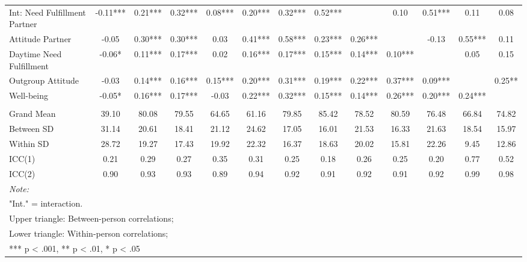 \begin{sidewaystable*}[!hbtp]
{\begin{tabular}[t]{lcccccccccccc}
\hspace{1em}Int: Need Fulfillment Partner & -0.11*** & 0.21*** & 0.32*** & 0.08*** & 0.20*** & 0.32*** & 0.52*** &  & 0.10 & 0.51*** & 0.11 & 0.08\\
\hspace{1em}Attitude Partner & -0.05 & 0.30*** & 0.30*** & 0.03 & 0.41*** & 0.58*** & 0.23*** & 0.26*** &  & -0.13 & 0.55*** & 0.11\\
\hspace{1em}Daytime Need Fulfillment & -0.06* & 0.11*** & 0.17*** & 0.02 & 0.16*** & 0.17*** & 0.15*** & 0.14*** & 0.10*** &  & 0.05 & 0.15\\
\hspace{1em}Outgroup Attitude & -0.03 & 0.14*** & 0.16*** & 0.15*** & 0.20*** & 0.31*** & 0.19*** & 0.22*** & 0.37*** & 0.09*** &  & 0.25**\\
\hspace{1em}Well-being & -0.05* & 0.16*** & 0.17*** & -0.03 & 0.22*** & 0.32*** & 0.15*** & 0.14*** & 0.26*** & 0.20*** & 0.24*** & \\
\addlinespace[0.3em]
\multicolumn{13}{l}{\textbf{Descriptives}}\\
\hspace{1em}Grand Mean & 39.10 & 80.08 & 79.55 & 64.65 & 61.16 & 79.85 & 85.42 & 78.52 & 80.59 & 76.48 & 66.84 & 74.82\\
\hspace{1em}Between SD & 31.14 & 20.61 & 18.41 & 21.12 & 24.62 & 17.05 & 16.01 & 21.53 & 16.33 & 21.63 & 18.54 & 15.97\\
\hspace{1em}Within SD & 28.72 & 19.27 & 17.43 & 19.92 & 22.32 & 16.37 & 18.63 & 20.02 & 15.81 & 22.26 & 9.45 & 12.86\\
\hspace{1em}ICC(1) & 0.21 & 0.29 & 0.27 & 0.35 & 0.31 & 0.25 & 0.18 & 0.26 & 0.25 & 0.20 & 0.77 & 0.52\\
\hspace{1em}ICC(2) & 0.90 & 0.93 & 0.93 & 0.89 & 0.94 & 0.92 & 0.91 & 0.92 & 0.91 & 0.92 & 0.99 & 0.98\\
\bottomrule
\multicolumn{13}{l}{\rule{0pt}{1em}\textit{Note: }}\\
\multicolumn{13}{l}{\rule{0pt}{1em}"Int." = interaction.}\\
\multicolumn{13}{l}{\rule{0pt}{1em}Upper triangle: Between-person correlations;}\\
\multicolumn{13}{l}{\rule{0pt}{1em}Lower triangle: Within-person correlations;}\\
\multicolumn{13}{l}{\rule{0pt}{1em}*** p < .001, ** p < .01,  * p < .05}\\
\end{tabular}}
\end{sidewaystable*}
